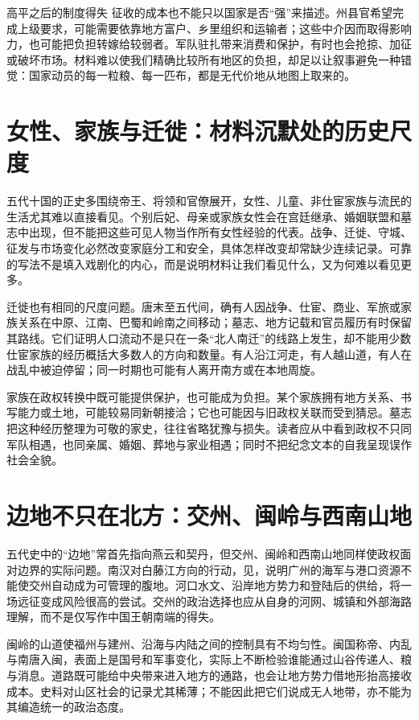 \begin{causalchain}{高平之后的制度得失}
征收的成本也不能只以国家是否“强”来描述。州县官希望完成上级要求，可能需要依靠地方富户、乡里组织和运输者；这些中介因而取得影响力，也可能把负担转嫁给较弱者。军队驻扎带来消费和保护，有时也会抢掠、加征或破坏市场。材料难以使我们精确比较所有地区的负担，却足以让叙事避免一种错觉：国家动员的每一粒粮、每一匹布，都是无代价地从地图上取来的。

\section{女性、家族与迁徙：材料沉默处的历史尺度}

五代十国的正史多围绕帝王、将领和官僚展开，女性、儿童、非仕宦家族与流民的生活尤其难以直接看见。个别后妃、母亲或家族女性会在宫廷继承、婚姻联盟和墓志中出现，但不能把这些可见人物当作所有女性经验的代表。战争、迁徙、守城、征发与市场变化必然改变家庭分工和安全，具体怎样改变却常缺少连续记录。可靠的写法不是填入戏剧化的内心，而是说明材料让我们看见什么，又为何难以看见更多。

迁徙也有相同的尺度问题。唐末至五代间，确有人因战争、仕宦、商业、军旅或家族关系在中原、江南、巴蜀和岭南之间移动；墓志、地方记载和官员履历有时保留其路线。它们证明人口流动不是只在一条“北人南迁”的线路上发生，却不能用少数仕宦家族的经历概括大多数人的方向和数量。有人沿江河走，有人越山道，有人在战乱中被迫停留；同一时期也可能有人离开南方或在本地周旋。

家族在政权转换中既可能提供保护，也可能成为负担。某个家族拥有地方关系、书写能力或土地，可能较易同新朝接洽；它也可能因与旧政权关联而受到猜忌。墓志把这种经历整理为可敬的家史，往往省略犹豫与损失。读者应从中看到政权不只同军队相遇，也同亲属、婚姻、葬地与家业相遇；同时不把纪念文本的自我呈现误作社会全貌。

\section{边地不只在北方：交州、闽岭与西南山地}

五代史中的“边地”常首先指向燕云和契丹，但交州、闽岭和西南山地同样使政权面对边界的实际问题。南汉对白藤江方向的行动，见，说明广州的海军与港口资源不能使交州自动成为可管理的腹地。河口水文、沿岸地方势力和登陆后的供给，将一场远征变成风险很高的尝试。交州的政治选择也应从自身的河网、城镇和外部海路理解，而不是仅写作中国王朝南端的得失。

闽岭的山道使福州与建州、沿海与内陆之间的控制具有不均匀性。闽国称帝、内乱与南唐入闽，表面上是国号和军事变化，实际上不断检验谁能通过山谷传递人、粮与消息。道路既可能给中央带来进入地方的通路，也会让地方势力借地形抬高接收成本。史料对山区社会的记录尤其稀薄；不能因此把它们说成无人地带，亦不能为其编造统一的政治态度。


\end{causalchain}
